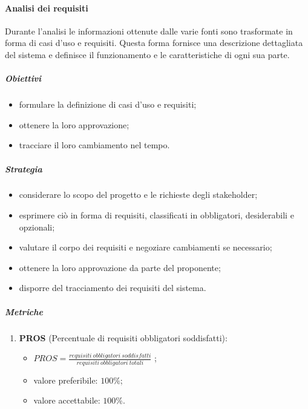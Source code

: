         \paragraph{Analisi dei requisiti}
            Durante l'analisi le informazioni ottenute dalle varie fonti sono trasformate in forma di casi d'uso e requisiti.
            Questa forma fornisce una descrizione dettagliata del sistema e definisce il funzionamento e le caratteristiche di ogni sua parte.
            \subparagraph{Obiettivi}
                \begin{itemize}
                    \item formulare la definizione di casi d'uso e requisiti;
                    \item ottenere la loro approvazione;
                    \item tracciare il loro cambiamento nel tempo.
                \end{itemize}
            \subparagraph{Strategia}
                \begin{itemize}
                    \item considerare lo scopo del progetto e le richieste degli stakeholder;
                    \item esprimere ciò in forma di requisiti, classificati in obbligatori, desiderabili e opzionali;
                    \item valutare il corpo dei requisiti e negoziare cambiamenti se necessario;
                    \item ottenere la loro approvazione da parte del proponente;
                    \item disporre del tracciamento dei requisiti del sistema.
                \end{itemize}
            \subparagraph{Metriche}
                \begin{enumerate}
                    \item \textbf{PROS} (Percentuale di requisiti obbligatori soddisfatti):
                    \begin{itemize}
                        \item $PROS = \frac{requisiti\ obbligatori\ soddisfatti}{requisiti\ obbligatori\ totali}$ ;
                        \item valore preferibile: $100\%$;
                        \item valore accettabile: $100\%$.
                    \end{itemize}
                \end{enumerate}
